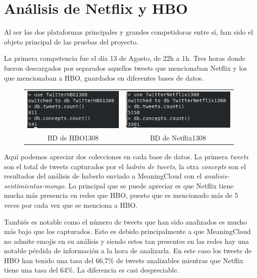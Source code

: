 \section{Análisis de Netflix y HBO}
Al ser las dos plataformas principales y grandes competidoras entre sí, han sido el objeto principal de las pruebas del proyecto. 

La primera competencia fue el día 13 de Agosto, de 22h a 1h. Tres horas donde fueron descargados por separados aquellos tweets que mencionaban Netflix y los que mencionaban a HBO, guardados en diferentes bases de datos. 

\begin{figure}[H]
	\centering
	\begin{tabular}{c c}
		
		\includegraphics[scale=.62]{imagenes/HBO1308Mongo.png}
		&  \includegraphics[scale=.65]{imagenes/Netflix1308Mongo.png} \\ 
		
		{BD de HBO1308}
		
		&  {BD de Netflix1308} \\ 
		
	\end{tabular} 
	\label{fig:Mongo1308}
\end{figure}

Aquí podemos apreciar dos colecciones en cada base de datos. La primera \textit{tweets} son el total de tweets capturados por el \textit{ladrón de tweets}, la otra \textit{concepts} son el resultados del análisis de haberlo enviado a MeaningCloud con el \textit{analisis-sentimientos-mongo}. Lo principal que se puede apreciar es que Netflix tiene mucha más presencia en redes que HBO, puesto que es mencionado más de 5 veces por cada vez que se menciona a HBO. 

Tambiés es notable como el número de tweets que han sido analizados es mucho más bajo que los capturados. Esto es debido principalmente a que MeaningCloud no admite emojis en su análisis y siendo estos tan presentes en las redes hay una notable pérdida de información a la hora de analizarla. En este caso los tweets de HBO han tenido una tasa del 66,7\% de tweets analizables mientras que Netflix tiene una tasa del 64\%. La diferencia es casi despreciable. 


